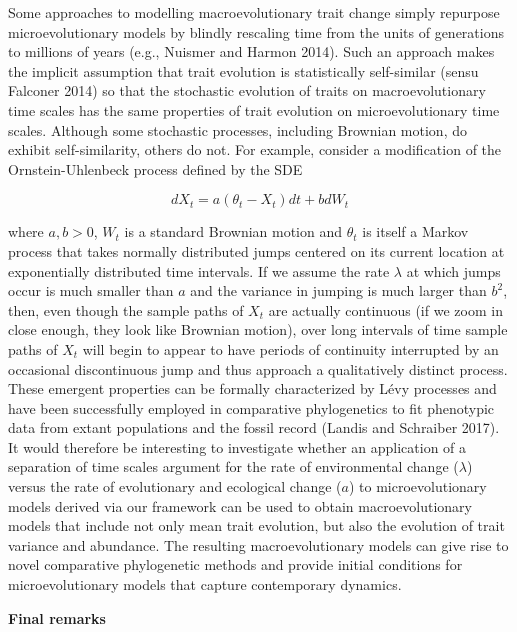 \documentclass[]{article}
\begin{document}
Some approaches to modelling macroevolutionary trait change simply
repurpose microevolutionary models by blindly rescaling time from the
units of generations to millions of years (e.g., Nuismer and Harmon
2014). Such an approach makes the implicit assumption that trait
evolution is statistically self-similar (sensu Falconer 2014) so that
the stochastic evolution of traits on macroevolutionary time scales has
the same properties of trait evolution on microevolutionary time scales.
Although some stochastic processes, including Brownian motion, do
exhibit self-similarity, others do not. For example, consider a
modification of the Ornstein-Uhlenbeck process defined by the SDE

\begin{equation}
dX_t=a(\theta_t-X_t)dt+bdW_t
\end{equation}

where \(a,b>0\), \(W_t\) is a standard Brownian motion and \(\theta_t\)
is itself a Markov process that takes normally distributed jumps
centered on its current location at exponentially distributed time
intervals. If we assume the rate \(\lambda\) at which jumps occur is
much smaller than \(a\) and the variance in jumping is much larger than
\(b^2\), then, even though the sample paths of \(X_t\) are actually
continuous (if we zoom in close enough, they look like Brownian motion),
over long intervals of time sample paths of \(X_t\) will begin to appear
to have periods of continuity interrupted by an occasional discontinuous
jump and thus approach a qualitatively distinct process. These emergent
properties can be formally characterized by Lévy processes and have been
successfully employed in comparative phylogenetics to fit phenotypic
data from extant populations and the fossil record (Landis and Schraiber
2017). It would therefore be interesting to investigate whether an
application of a separation of time scales argument for the rate of
environmental change (\(\lambda\)) versus the rate of evolutionary and
ecological change (\(a\)) to microevolutionary models derived via our
framework can be used to obtain macroevolutionary models that include
not only mean trait evolution, but also the evolution of trait variance
and abundance. The resulting macroevolutionary models can give rise to
novel comparative phylogenetic methods and provide initial conditions
for microevolutionary models that capture contemporary dynamics.

\textbf{Final remarks}
\end{document}
